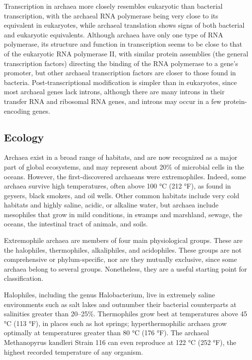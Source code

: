 Transcription in archaea more closely resembles eukaryotic than bacterial transcription, with the archaeal RNA polymerase being very close to its equivalent in eukaryotes, while archaeal translation shows signs of both bacterial and eukaryotic equivalents. Although archaea have only one type of RNA polymerase, its structure and function in transcription seems to be close to that of the eukaryotic RNA polymerase II, with similar protein assemblies (the general transcription factors) directing the binding of the RNA polymerase to a gene's promoter, but other archaeal transcription factors are closer to those found in bacteria. Post-transcriptional modification is simpler than in eukaryotes, since most archaeal genes lack introns, although there are many introns in their transfer RNA and ribosomal RNA genes, and introns may occur in a few protein-encoding genes.

\hypertarget{ecology}{%
\subsection{Ecology}\label{ecology}}

Archaea exist in a broad range of habitats, and are now recognized as a major part of global ecosystems, and may represent about 20\% of microbial cells in the oceans. However, the first-discovered archaeans were extremophiles. Indeed, some archaea survive high temperatures, often above 100 °C (212 °F), as found in geysers, black smokers, and oil wells. Other common habitats include very cold habitats and highly saline, acidic, or alkaline water, but archaea include mesophiles that grow in mild conditions, in swamps and marshland, sewage, the oceans, the intestinal tract of animals, and soils.

Extremophile archaea are members of four main physiological groups. These are the halophiles, thermophiles, alkaliphiles, and acidophiles. These groups are not comprehensive or phylum-specific, nor are they mutually exclusive, since some archaea belong to several groups. Nonetheless, they are a useful starting point for classification.

Halophiles, including the genus Halobacterium, live in extremely saline environments such as salt lakes and outnumber their bacterial counterparts at salinities greater than 20--25\%. Thermophiles grow best at temperatures above 45 °C (113 °F), in places such as hot springs; hyperthermophilic archaea grow optimally at temperatures greater than 80 °C (176 °F). The archaeal Methanopyrus kandleri Strain 116 can even reproduce at 122 °C (252 °F), the highest recorded temperature of any organism.

